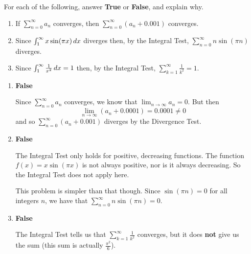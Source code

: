 \documentclass[noinstructornotes]{ximera}
\begin{document}
\begin{problem}
For each of the following, answer {\bf True} or {\bf False}, and explain why.
	\begin{enumerate}
	
	\item  If $\sum_{n=0}^\infty a_n$ converges, then $\sum_{n=0}^\infty (a_n + 0.001)$ converges.
	
	\item  Since $\int_1^\infty x \sin(\pi x) \,d x$ diverges then, by the Integral Test, $\sum_{n=0}^\infty n \sin(\pi n)$ diverges.
	
	\item  Since $\int_1^\infty \frac{1}{x^2} \,d x = 1$ then, by the Integral Test, $\sum_{k=1}^\infty \frac{1}{k^2} = 1$.  
	
	\end{enumerate}
	
	\begin{freeResponse}
		\begin{enumerate}
		
		\item  {\bf False}
		
		Since $\sum_{n=0}^\infty a_n$ converges, we know that $\lim_{n \to \infty} a_n = 0$.  
		But then 
			\[
			\lim_{n \to \infty} (a_n + 0.0001) = 0.0001 \neq 0
			\]
		and so $\sum_{n=0}^\infty (a_n + 0.001)$ diverges by the Divergence Test.
		
		
		
		\item  {\bf False}
		
		The Integral Test only holds for positive, decreasing functions.  
		The function $f(x)= x \sin(\pi x)$ is not always positive, nor is it always decreasing.  
		So the Integral Test does not apply here.
		
		This problem is simpler than that though.  
		Since $\sin(\pi n) = 0$ for all integers $n$, we have that $\sum_{n=0}^\infty n \sin(\pi n) = 0$.
		
		
		
		\item  {\bf False}
		
		The Integral Test tells us that $\sum_{k=1}^\infty \frac{1}{k^2}$ converges, but it does {\bf not} give us the sum (this sum is actually $\frac{\pi^2}{6}$).  
		
		\end{enumerate}
	\end{freeResponse}
	
\end{problem}
\end{document}
